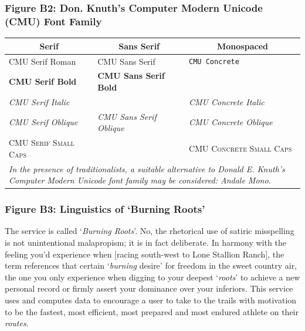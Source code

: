 \documentclass[11pt, english]{article}
\begin{document}
		\subsubsection*{Figure B2: Don. Knuth's Computer Modern Unicode (CMU) Font Family}

		\begin{table}[h]
			\scriptsize
			\renewcommand{\arraystretch}{1.25}
		\begin{center}
		\begin{tabular}{p{4cm}p{4cm}p{4cm}}
			\hline
			\multicolumn{1}{c}{\textbf{Serif}} & \multicolumn{1}{c}{\textbf{Sans Serif}} & \multicolumn{1}{c}{\textbf{Monospaced}}\\
			\hline
			CMU Serif Roman & \textsf{CMU Sans Serif} & \texttt{CMU Concrete}\\
			\textbf{CMU Serif Bold} & \sffamily \textbf{CMU Sans Serif Bold} & \\ 
				\textit{CMU Serif Italic} & & \ttfamily \textit{CMU Concrete Italic}\\
			\textsl{CMU Serif Oblique} & \sffamily \textsl{CMU Sans Serif Oblique} & \ttfamily \textsl{CMU Concrete Oblique}\\
				\textsc{CMU Serif Small Caps} & & \ttfamily \textsc{CMU Concrete Small Caps}\\
			\hline
				\multicolumn{3}{p{13cm}}{\textit{In the presence of traditionalists, a suitable alternative to Donald E. Knuth's Computer Modern Unicode font family may be considered: Andale Mono.}}\\
			\hline
		\end{tabular}
		\end{center}
		\end{table}

\newpage

		\subsubsection*{Figure B3: Linguistics of `Burning Roots'}

	The service is called `\textit{Burning Roots}'. No, the rhetorical use of satiric misspelling is not unintentional malapropism; it is in fact deliberate. In harmony with the feeling you'd experience when [racing south-west to Lone Stallion Ranch], the term references that certain `\textit{burning} desire' for freedom in the sweet country air, the one you only experience when digging to your deepest `\textit{roots}' to achieve a new personal record or firmly assert your dominance over your inferiors. This service uses and computes data to encourage a user to take to the trails with motivation to be the fastest, most efficient, most prepared and most endured athlete on their \textit{routes}.
\end{document}
